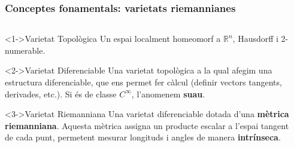\documentclass[10pt]{beamer}
\begin{document}
\begin{frame}
  \frametitle{Conceptes fonamentals: varietats riemannianes}
  
  \begin{columns}[T] %
      
      \begin{column}{0.55\textwidth}
          
          \begin{block}<1->{Varietat Topològica}
              Un espai localment homeomorf a $\mathbb{R}^n$, Hausdorff i 2-numerable.
          \end{block}
          
          \begin{block}<2->{Varietat Diferenciable}
              Una varietat topològica a la qual afegim una estructura diferenciable, que ens permet fer càlcul (definir vectors tangents, derivades, etc.). Si és de classe $C^\infty$, l'anomenem \textbf{suau}.
          \end{block}
          
          \begin{block}<3->{Varietat Riemanniana}
              Una varietat diferenciable dotada d'una \textbf{mètrica riemanniana}. Aquesta mètrica assigna un producte escalar a l'espai tangent de cada punt, permetent mesurar longituds i angles de manera \textbf{intrínseca}.
          \end{block}
          
      \end{column}
      
      \begin{column}{0.4\textwidth}
          \centering
          \vspace{2cm}
          
          

\end{column}
\end{columns}
\end{frame}
\end{document}

